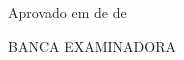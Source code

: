

% 

\begin{folhadeaprovacao}
    \ABNTEXchapterfont%
    \center%
    \setlength{\ABNTEXsignwidth}{10cm}

    \ComponenteAutor{}
    \vspace{\fill}

    \ComponenteTituloESubtitulo{}
    \vspace{\fill}

    \ComponenteNatureza{}
    \vspace{\fill}

    \begin{flushleft}
        Aprovado em \ValorDoDia{} de \ValorDoMes{} de \ValorDoAno{}
    \end{flushleft}
    \vspace{0.5cm}

    {BANCA EXAMINADORA}




    \ifDefinidoCoorientador%
    \fi

    \ifDefinidoExaminadorUm%
        \assinatura*{%
            \ValorDoNomeCompletoDoExaminadorUmComTitulo{}\\
            \ValorDoNomeDaInstituicaoDoExaminadorUm{}\\
        }
    \fi


\end{folhadeaprovacao}
